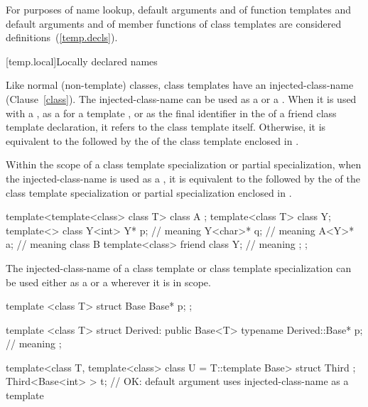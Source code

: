 \pnum
\enternote
For purposes of name lookup, default arguments and
 of function templates and default
arguments and  of
member functions of class templates are considered definitions~(\ref{temp.decls}).
\exitnote

[temp.local]{Locally declared names}

\pnum
Like normal (non-template) classes, class templates have an
injected-class-name (Clause~\ref{class}).
The
injected-class-name can be used
as a  or a .
When it is used with a
,
as a  for a template ,
or as the final identifier in the  of
a friend class template declaration,
it refers to the
class template itself. Otherwise, it is equivalent to the 
followed by the  of the class template
enclosed in \tcode{<>}.

\pnum
Within the scope of a class template specialization or
partial specialization, when the injected-class-name is
used as a ,
it is equivalent to the  followed by the
of the class template specialization or partial
specialization enclosed in
\tcode{<>}.
\enterexample
\begin{codeblock}
template<template<class> class T> class A { };
template<class T> class Y;
template<> class Y<int> {
  Y* p;                               // meaning 
  Y<char>* q;                         // meaning 
  A<Y>* a;                            // meaning 
  class B {
    template<class> friend class Y;   // meaning 
  };
};
\end{codeblock}
\exitexample

\pnum
The injected-class-name of a class template or class
template specialization can be used either
as a  or a 
wherever it is in scope.
\enterexample

\begin{codeblock}
template <class T> struct Base {
  Base* p;
};

template <class T> struct Derived: public Base<T> {
  typename Derived::Base* p;    // meaning 
};

template<class T, template<class> class U = T::template Base> struct Third { };
Third<Base<int> > t;            // OK: default argument uses injected-class-name as a template
\end{codeblock}
\exitexample

